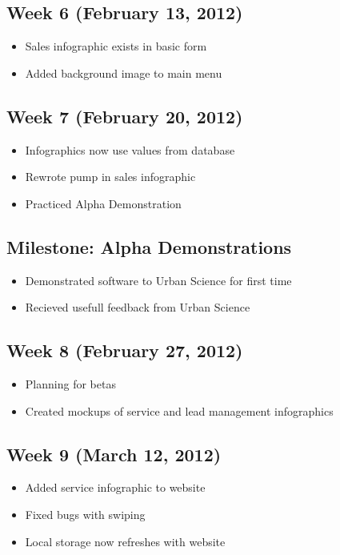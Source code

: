 \documentclass[11pt,a4paper,oneside]{article}
\begin{document}
\subsection{Week 6 (February 13, 2012)}
\begin{itemize}
\item Sales infographic exists in basic form
\item Added background image to main menu
\end{itemize}

\subsection{Week 7 (February 20, 2012)}
\begin{itemize}
\item Infographics now use values from database
\item Rewrote pump in sales infographic
\item Practiced Alpha Demonstration
\end{itemize}

\subsection{Milestone: Alpha Demonstrations}
\begin{itemize}
\item Demonstrated software to Urban Science for first time
\item Recieved usefull feedback from Urban Science
\end{itemize}

\subsection{Week 8 (February 27, 2012)}
\begin{itemize}
\item Planning for betas
\item Created mockups of service and lead management infographics
\end{itemize}

\subsection{Week 9 (March 12, 2012)}
\begin{itemize}
\item Added service infographic to website
\item Fixed bugs with swiping
\item Local storage now refreshes with website
\end{itemize}
\end{document}
